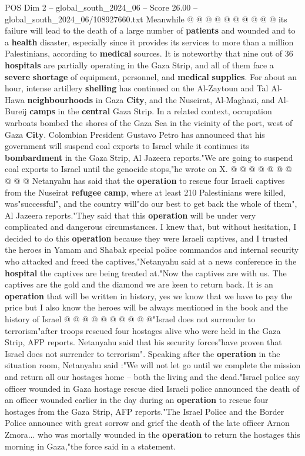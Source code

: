 \begin{textsample}{POS Dim 2 – global\_south\_2024\_06 – Score 26.00 – global\_south\_2024\_06/108927660.txt}
Meanwhile @ @ @ @ @ @ @ @ @ @ its failure will lead to the death of a large number of \textbf{patients} and wounded and to a \textbf{health} disaster, especially since it provides its services to more than a million Palestinians, according to \textbf{medical} sources.
It is noteworthy that nine out of 36 \textbf{hospitals} are partially operating in the Gaza Strip, and all of them face a \textbf{severe} \textbf{shortage} of equipment, personnel, and \textbf{medical} \textbf{supplies}.
For about an hour, intense artillery \textbf{shelling} has continued on the Al-Zaytoun and Tal Al-Hawa \textbf{neighbourhoods} in Gaza \textbf{City}, and the Nuseirat, Al-Maghazi, and Al-Bureij \textbf{camps} in the \textbf{central} Gaza Strip.
In a related context, occupation warboats bombed the shores of the Gaza Sea in the vicinity of the port, west of Gaza \textbf{City}.
Colombian President Gustavo Petro has announced that his government will suspend coal exports to Israel while it continues its \textbf{bombardment} in the Gaza Strip, Al Jazeera reports."We are going to suspend coal exports to Israel until the genocide stops,"he wrote on X. @ @ @ @ @ @ @ @ @ @ Netanyahu has said that the \textbf{operation} to rescue four Israeli captives from the Nuseirat \textbf{refugee} \textbf{camp}, where at least 210 Palestinians were killed, was"successful", and the country will"do our best to get back the whole of them", Al Jazeera reports."They said that this \textbf{operation} will be under very complicated and dangerous circumstances.
I knew that, but without hesitation, I decided to do this \textbf{operation} because they were Israeli captives, and I trusted the heroes in Yamam and Shabak special police commandos and internal security who attacked and freed the captives,"Netanyahu said at a news conference in the \textbf{hospital} the captives are being treated at."Now the captives are with us.
The captives are the gold and the diamond we are keen to return back.
It is an \textbf{operation} that will be written in history, yes we know that we have to pay the price but I also know the heroes will be always mentioned in the book and the history of Israel @ @ @ @ @ @ @ @ @ @"Israel does not surrender to terrorism"after troops rescued four hostages alive who were held in the Gaza Strip, AFP reports.
Netanyahu said that his security forces"have proven that Israel does not surrender to terrorism".
Speaking after the \textbf{operation} in the situation room, Netanyahu said :"We will not let go until we complete the mission and return all our hostages home -- both the living and the dead."Israel police say officer wounded in Gaza hostage rescue died Israeli police announced the death of an officer wounded earlier in the day during an \textbf{operation} to rescue four hostages from the Gaza Strip, AFP reports."The Israel Police and the Border Police announce with great sorrow and grief the death of the late officer Arnon Zmora... who was mortally wounded in the \textbf{operation} to return the hostages this morning in Gaza,"the force said in a statement.

\end{textsample}
